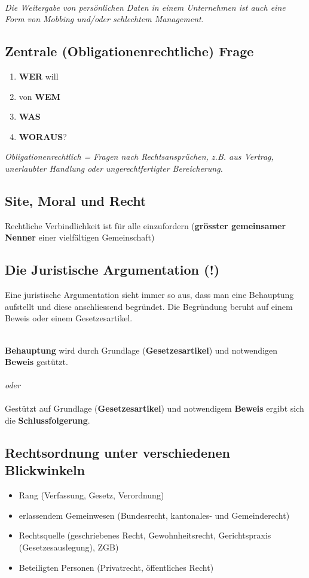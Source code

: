 \mbox{}\\
\emph{Die Weitergabe von persönlichen Daten in einem Unternehmen ist
auch eine Form von Mobbing und/oder schlechtem Management.}

\subsection{Zentrale (Obligationenrechtliche) Frage}

\begin{enumerate}
\def\labelenumi{\arabic{enumi})}
\tightlist
\item \textbf{WER} will
\item von \textbf{WEM}
\item \textbf{WAS}
\item \textbf{WORAUS}?
\end{enumerate}

\emph{Obligationenrechtlich = Fragen nach Rechtsansprüchen, z.B. aus Vertrag,
unerlaubter Handlung oder ungerechtfertigter Bereicherung.}

\subsection{Site, Moral und Recht}

Rechtliche Verbindlichkeit ist für alle einzufordern (\textbf{grösster
gemeinsamer Nenner} einer vielfältigen Gemeinschaft)


\subsection{Die Juristische Argumentation (!)}

Eine juristische Argumentation sieht immer so aus, dass man eine
Behauptung aufstellt und diese anschliessend begründet. Die Begründung
beruht auf einem Beweis oder einem Gesetzesartikel.

\mbox{}\\
\textbf{Behauptung} wird durch Grundlage (\textbf{Gesetzesartikel}) und
notwendigen \textbf{Beweis} gestützt.\\
\\
\textit{oder}\\ 
\\
Gestützt auf Grundlage (\textbf{Gesetzesartikel}) und notwendigem
\textbf{Beweis} ergibt sich die \textbf{Schlussfolgerung}.


\subsection{Rechtsordnung unter verschiedenen Blickwinkeln}
%
\begin{itemize}
\tightlist
\item Rang (Verfassung, Gesetz, Verordnung)
\item erlassendem Gemeinwesen (Bundesrecht, kantonales- und
Gemeinderecht)
\item Rechtsquelle (geschriebenes Recht, Gewohnheitsrecht,
Gerichtspraxis (Gesetzesauslegung), ZGB)
\item Beteiligten Personen (Privatrecht, öffentliches Recht)
\end{itemize}



